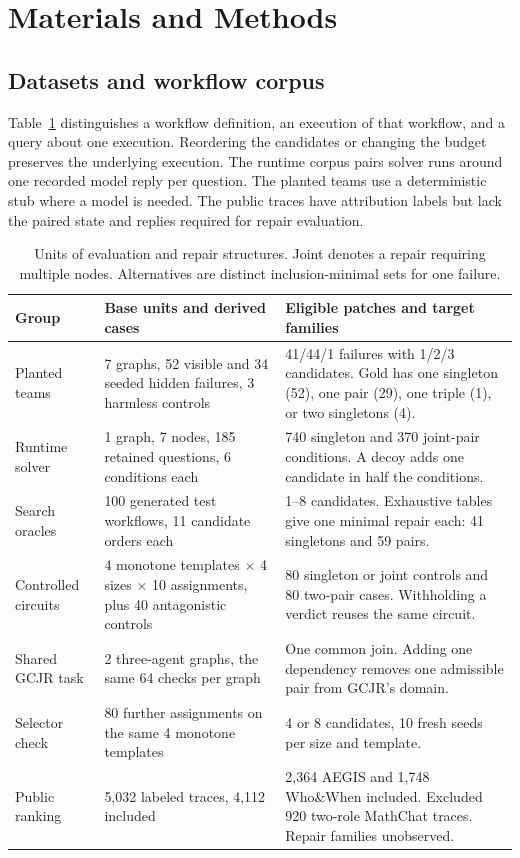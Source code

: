 \documentclass[11pt,letterpaper]{article}
\begin{document}
\section{Materials and Methods}
\subsection{Datasets and workflow corpus}
Table~\ref{tab:corpus} distinguishes a workflow definition, an execution of that workflow, and a query about one execution. Reordering the candidates or changing the budget preserves the underlying execution. The runtime corpus pairs solver runs around one recorded model reply per question. The planted teams use a deterministic stub where a model is needed. The public traces have attribution labels but lack the paired state and replies required for repair evaluation.

\begin{table}[htbp]\small\centering
\caption{Units of evaluation and repair structures. Joint denotes a repair requiring multiple nodes. Alternatives are distinct inclusion-minimal sets for one failure.}\label{tab:corpus}
\begin{tabular}{@{}p{.16\linewidth}p{.31\linewidth}p{.46\linewidth}@{}}\toprule
Group & Base units and derived cases & Eligible patches and target families\\\midrule
Planted teams & 7 graphs, 52 visible and 34 seeded hidden failures, 3 harmless controls & 41/44/1 failures with 1/2/3 candidates. Gold has one singleton (52), one pair (29), one triple (1), or two singletons (4).\\
Runtime solver & 1 graph, 7 nodes, 185 retained questions, 6 conditions each & 740 singleton and 370 joint-pair conditions. A decoy adds one candidate in half the conditions.\\
Search oracles & 100 generated test workflows, 11 candidate orders each & 1--8 candidates. Exhaustive tables give one minimal repair each: 41 singletons and 59 pairs.\\
Controlled circuits & 4 monotone templates $\times$ 4 sizes $\times$ 10 assignments, plus 40 antagonistic controls & 80 singleton or joint controls and 80 two-pair cases. Withholding a verdict reuses the same circuit.\\
Shared GCJR task & 2 three-agent graphs, the same 64 checks per graph & One common join. Adding one dependency removes one admissible pair from GCJR's domain.\\
Selector check & 80 further assignments on the same 4 monotone templates & 4 or 8 candidates, 10 fresh seeds per size and template.\\
Public ranking & 5,032 labeled traces, 4,112 included & 2,364 AEGIS and 1,748 Who\&When included. Excluded 920 two-role MathChat traces. Repair families unobserved.\\\bottomrule
\end{tabular}\end{table}
\end{document}
